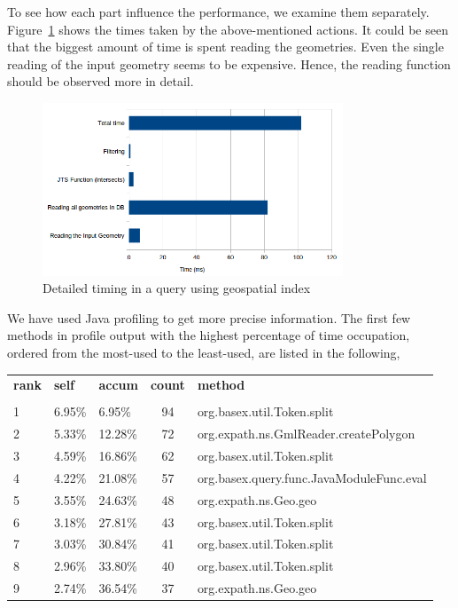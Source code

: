 \documentclass[a4paper,12pt]{article}
\begin{document}
To see how each part influence the performance, we examine them separately. Figure~\ref{figDetailedTiming} shows the times taken by the above-mentioned actions. It could be seen that the biggest amount of time is spent reading the geometries. Even the single reading of the input geometry seems to be expensive. Hence, the reading function should be observed more in detail.

\begin{figure}
\centering
\includegraphics[width=0.8\textwidth,height=0.25\textheight]{detailedTiming}
\caption{Detailed timing in a query using geospatial index}
\label{figDetailedTiming}
\end{figure}


We have used Java profiling to get more precise information. The first few methods in profile output with the highest percentage of time occupation, ordered from the most-used to the least-used, are listed in the following,

\vspace{10px}
\begin{tabular}{l l l c l}
\textbf{rank} & \textbf{self} & \textbf{accum} & \textbf{count} & \textbf{method} \\
 & & & &\\
1 & 6.95\% & 6.95\% & 94 & org.basex.util.Token.{\color{red}split}\\
2 & 5.33\% & 12.28\% & 72 & org.expath.ns.GmlReader.createPolygon \\
3 & 4.59\% & 16.86\% & 62 & org.basex.util.Token.{\color{red}split} \\
4 & 4.22\% & 21.08\% & 57 & org.basex.query.func.JavaModuleFunc.eval \\
5 & 3.55\% & 24.63\% & 48 & org.expath.ns.Geo.geo \\
6 & 3.18\% & 27.81\% & 43 & org.basex.util.Token.{\color{red}split} \\
7 & 3.03\% & 30.84\% & 41 & org.basex.util.Token.{\color{red}split} \\
8 & 2.96\% & 33.80\% & 40 & org.basex.util.Token.{\color{red}split} \\
9 & 2.74\% & 36.54\% & 37 & org.expath.ns.Geo.geo \\
\end{tabular}
\vspace{10px}
\end{document}
